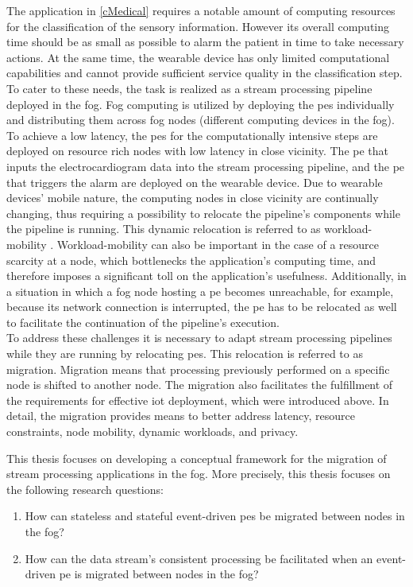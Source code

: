 The application in \ref{cMedical} requires a notable amount of computing resources for the classification of the sensory information. However its overall computing time should be as small as possible to alarm the patient in time to take necessary actions. At the same time, the wearable device has only limited computational capabilities and cannot provide sufficient service quality in the classification step. To cater to these needs, the task is realized as a stream processing pipeline deployed in the fog. Fog computing is utilized by deploying the \gls{pe}s individually and distributing them across fog nodes (different computing devices in the fog). To achieve a low latency, the \gls{pe}s for the computationally intensive steps are deployed on resource rich nodes with low latency in close vicinity. The \gls{pe} that inputs the electrocardiogram data into the stream processing pipeline, and the \gls{pe} that triggers the alarm are deployed on the wearable device. Due to wearable devices' mobile nature, the computing nodes in close vicinity are continually changing, thus requiring a possibility to relocate the pipeline's components while the pipeline is running. This dynamic relocation is referred to as workload-mobility \cite{Yigitoglu.2017}. Workload-mobility can also be important in the case of a resource scarcity at a node, which bottlenecks the application's computing time, and therefore imposes a significant toll on the application's usefulness. Additionally, in a situation in which a fog node hosting a \gls{pe} becomes unreachable, for example, because its network connection is interrupted, the \gls{pe} has to be relocated as well to facilitate the continuation of the pipeline's execution.\\
To address these challenges it is necessary to adapt stream processing pipelines while they are running by relocating \gls{pe}s. This relocation is referred to as migration. Migration means that processing previously performed on a specific node is shifted to another node. The migration also facilitates the fulfillment of the requirements for effective \gls{iot} deployment, which were introduced above. In detail, the migration provides means to better address latency, resource constraints, node mobility, dynamic workloads, and privacy.\par
This thesis focuses on developing a conceptual framework for the migration of stream processing applications in the fog. More precisely, this thesis focuses on the following research questions:

\begin{enumerate}[label=Research Question \arabic* , wide=0.5em,  leftmargin=*]
    \item \label{rqMigration} How can stateless and stateful event-driven \gls{pe}s be migrated between nodes in the fog?
    \item \label{rqConsistency} How can the data stream's consistent processing be facilitated when an event-driven \gls{pe} is migrated between nodes in the fog?
\end{enumerate}

